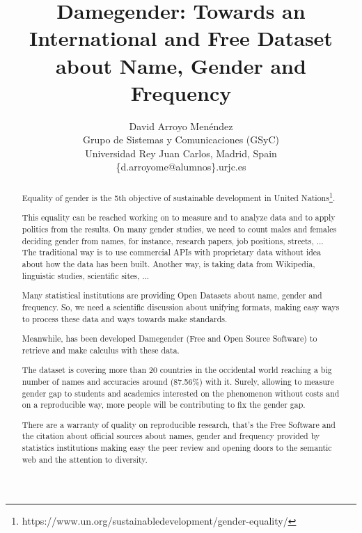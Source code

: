 \documentclass[a4paper]{article}
\title{Damegender: Towards an International and Free Dataset about Name, Gender and Frequency}
\author{
David Arroyo Menéndez \\ Grupo de Sistemas y Comunicaciones (GSyC) \\ Universidad Rey Juan Carlos, Madrid, Spain \\ \{d.arroyome@alumnos\}.urjc.es
}
\begin{document}
\maketitle

\begin{abstract}

  Equality of gender is the 5th objective of sustainable development
  in United
  Nations\footnote{https://www.un.org/sustainabledevelopment/gender-equality/}.

  This equality can be reached working on to measure and to analyze
  data and to apply politics from the results. On many gender studies,
  we need to count males and females deciding gender from names, for
  instance, research papers, job positions, streets, ... The
  traditional way is to use commercial APIs with proprietary data
  without idea about how the data has been built. Another way, is
  taking data from Wikipedia, linguistic studies, scientific sites, ...


  Many statistical institutions are providing Open Datasets about
  name, gender and frequency. So, we need a scientific discussion
  about unifying formats, making easy ways to process these data and
  ways towards make standards.

  Meanwhile, has been developed Damegender (Free and Open Source
  Software) to retrieve and make calculus with these data.


  The dataset is covering more than 20 countries in the occidental
  world reaching a big number of names and accuracies around (87.56\%)
  with it. Surely, allowing to measure gender gap to students and
  academics interested on the phenomenon without costs and on a
  reproducible way, more people will be contributing to fix the gender
  gap.


  There are a warranty of quality on reproducible research, that's the
  Free Software and the citation about official sources about names,
  gender and frequency provided by statistics institutions making easy
  the peer review and opening doors to the semantic web and the
  attention to diversity.

\end{abstract}
\end{document}
